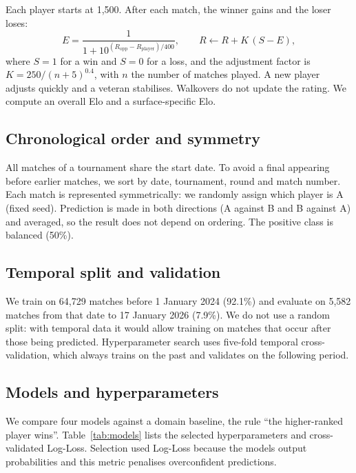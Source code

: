 \documentclass[11pt,a4paper]{article}
\begin{document}
Each player starts at 1,500. After each match, the winner gains and the loser loses:
\begin{equation}
  E = \frac{1}{1 + 10^{(R_{\text{opp}} - R_{\text{player}})/400}}, \qquad R \leftarrow R + K\,(S - E),
\end{equation}
where $S=1$ for a win and $S=0$ for a loss, and the adjustment factor is $K = 250/(n+5)^{0.4}$, with $n$ the number of matches played. A new player adjusts quickly and a veteran stabilises. Walkovers do not update the rating. We compute an overall Elo and a surface-specific Elo.

\subsection{Chronological order and symmetry}

All matches of a tournament share the start date. To avoid a final appearing before earlier matches, we sort by date, tournament, round and match number. Each match is represented symmetrically: we randomly assign which player is A (fixed seed). Prediction is made in both directions (A against B and B against A) and averaged, so the result does not depend on ordering. The positive class is balanced (50\%).

\subsection{Temporal split and validation}

We train on 64,729 matches before 1 January 2024 (92.1\%) and evaluate on 5,582 matches from that date to 17 January 2026 (7.9\%). We do not use a random split: with temporal data it would allow training on matches that occur after those being predicted. Hyperparameter search uses five-fold temporal cross-validation, which always trains on the past and validates on the following period.

\subsection{Models and hyperparameters}

We compare four models against a domain baseline, the rule ``the higher-ranked player wins''. Table~\ref{tab:models} lists the selected hyperparameters and cross-validated Log-Loss. Selection used Log-Loss because the models output probabilities and this metric penalises overconfident predictions.
\end{document}
